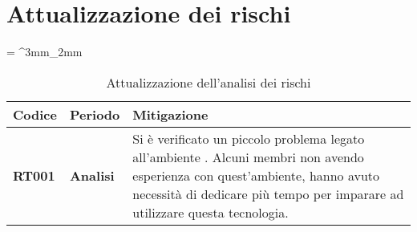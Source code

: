 \documentclass[PianoDiProgetto.tex]{subfiles}
\begin{document}
\chapter{Attualizzazione dei rischi }
\tabulinesep = ^3mm_2mm
\begin{longtabu} to 
	\caption[Attualizzazione dell'analisi dei rischi]{Attualizzazione dell'analisi dei rischi}
	\endlastfoot
	\rowfont{\bfseries\sffamily\leavevmode\color{white}}
	\textbf{Codice} & \textbf{Periodo} & \textbf{Mitigazione} \\
	\endhead
	
	 \textbf{RT001} & \textbf{Analisi} &  {
		Si è verificato un piccolo problema legato all'ambiente . Alcuni membri non avendo esperienza con quest'ambiente, hanno avuto necessità di dedicare più tempo per imparare ad utilizzare questa tecnologia.
	}
\\
\end{longtabu}
\end{document}
